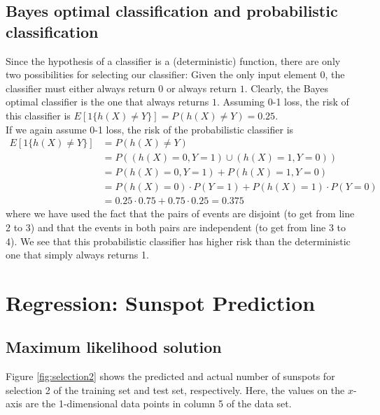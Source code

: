 \documentclass[a4paper]{article}
\begin{document}
\subsection{Bayes optimal classification and probabilistic classification}
Since the hypothesis of a classifier is a (deterministic) function, there are only two possibilities for selecting our classifier: Given the only input element $0$, the classifier must either always return $0$ or always return $1$. Clearly, the Bayes optimal classifier is the one that always returns $1$. Assuming 0-1 loss, the risk of this classifier is $E[1 \{ h(X) \neq Y \}] = P(h(X) \neq Y) = 0.25$.\\

If we again assume 0-1 loss, the risk of the probabilistic classifier is
\begin{align*}
E[1 \{ h(X) \neq Y \}] &= P(h(X) \neq Y) \\
&= P((h(X) = 0, Y = 1) \cup (h(X) = 1, Y = 0)) \\
&= P(h(X) = 0, Y = 1) + P(h(X) = 1, Y = 0) \\
&= P(h(X) = 0) \cdot P(Y = 1) + P(h(X) = 1) \cdot P(Y = 0) \\
&= 0.25 \cdot 0.75 + 0.75 \cdot 0.25 = 0.375
\end{align*}
where we have used the fact that the pairs of events are disjoint (to get from line 2 to 3) and that the events in both pairs are independent (to get from line 3 to 4). We see that this probabilistic classifier has higher risk than the deterministic one that simply always returns 1.

\section{Regression: Sunspot Prediction}

\subsection{Maximum likelihood solution}
Figure \ref{fig:selection2} shows the predicted and actual number of sunspots for selection 2 of the training set and test set, respectively. Here, the values on the $x$-axis are the 1-dimensional data points in column 5 of the data set.
\end{document}
